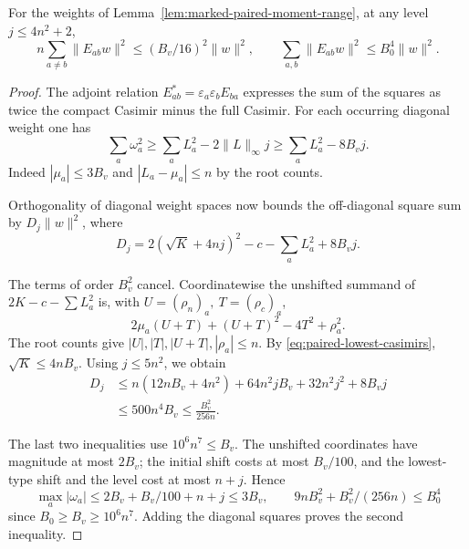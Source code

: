\begin{auxlemma}\label{lem:paired-lowest-casimir}
For the weights of Lemma~\ref{lem:marked-paired-moment-range}, at
any level \(j\le4n^2+2\),
\[
  n\sum_{a\ne b}\|E_{ab}w\|^2\le (B_v/16)^2\|w\|^2,
  \qquad \sum_{a,b}\|E_{ab}w\|^2\le B_0^4\|w\|^2 .
\]
\end{auxlemma}
\begin{proof}
The adjoint relation \(E_{ab}^*=\varepsilon_a\varepsilon_b E_{ba}\)
expresses the sum of the squares as twice the compact Casimir minus
the full Casimir. For each occurring diagonal weight one has
\[
 \sum_a\omega_a^2\ge \sum_a L_a^2-2\|L\|_\infty j
 \ge\sum_a L_a^2-8B_vj .
\]
Indeed \(|\mu_a|\le 3B_v\) and
\(|L_a-\mu_a|\le n\) by the root counts.

Orthogonality of diagonal weight spaces now bounds the off-diagonal
square sum by \(D_j\|w\|^2\), where
\[
 D_j=2(\sqrt K+4nj)^2-c-\sum_a L_a^2+8B_vj .
\]

The terms of order \(B_v^2\) cancel. Coordinatewise the unshifted
summand of \(2K-c-\sum L_a^2\) is, with
\(U=(\rho_n)_a,\ T=(\rho_c)_a\),
\[
       2\mu_a(U+T)+(U+T)^2-4T^2+\rho_a^2 .
\]
The root counts give \(|U|,|T|,|U+T|,|\rho_a|\le n\).
By \eqref{eq:paired-lowest-casimirs}, \(\sqrt K\le4nB_v\).
Using \(j\le5n^2\), we obtain
\begin{align*}
 D_j &\le n(12nB_v+4n^2)+64n^2j B_v+32n^2j^2+8B_vj\\
     &\le 500n^4B_v \le \frac{B_v^2}{256n}.
\end{align*}

The last two inequalities use \(10^6 n^7\le B_v\).
The unshifted coordinates have magnitude at most \(2B_v\);
the initial shift costs at most \(B_v/100\), and the lowest-type
shift and the level cost at most \(n+j\). Hence
\[
 \max_a |\omega_a|\le 2B_v+B_v/100+n+j\le3B_v,\qquad
 9nB_v^2+B_v^2/(256n)\le B_0^4
\]
since \(B_0\ge B_v\ge10^6n^7\). Adding the diagonal squares proves
the second inequality.
\end{proof}

